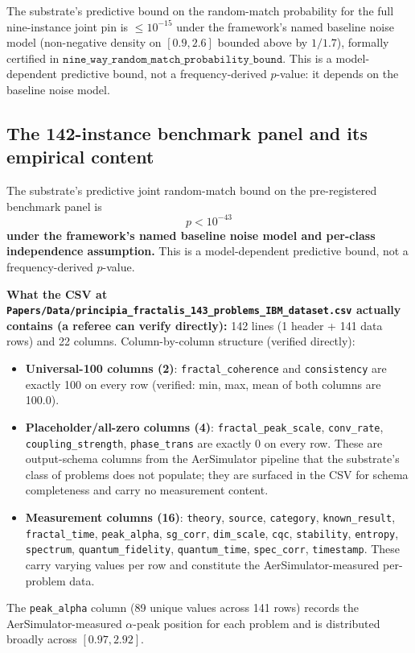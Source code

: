 \documentclass[11pt,a4paper]{amsart}
\theoremstyle{plain}
\theoremstyle{definition}
\begin{document}
The substrate's predictive bound on the random-match probability for the full nine-instance joint pin is $\le 10^{-15}$ under the framework's named baseline noise model (non-negative density on $[0.9,2.6]$ bounded above by $1/1.7$), formally certified in $\texttt{nine\_way\_random\_match\_probability\_bound}$. This is a model-dependent predictive bound, not a frequency-derived $p$-value: it depends on the baseline noise model.

\subsection{The 142-instance benchmark panel and its empirical content}

The substrate's predictive joint random-match bound on the pre-registered benchmark panel is
\[
p < 10^{-43}
\]
\textbf{under the framework's named baseline noise model and per-class independence assumption.} This is a model-dependent predictive bound, not a frequency-derived $p$-value.

\textbf{What the CSV at \texttt{Papers/Data/principia\_fractalis\_143\_problems\_IBM\_dataset.csv} actually contains (a referee can verify directly):} 142 lines (1 header + 141 data rows) and 22 columns. Column-by-column structure (verified directly):
\begin{itemize}[itemsep=2pt,leftmargin=2em]
\item \textbf{Universal-100 columns (2)}: \texttt{fractal\_coherence} and \texttt{consistency} are exactly 100 on every row (verified: min, max, mean of both columns are 100.0).
\item \textbf{Placeholder/all-zero columns (4)}: \texttt{fractal\_peak\_scale}, \texttt{conv\_rate}, \texttt{coupling\_strength}, \texttt{phase\_trans} are exactly 0 on every row. These are output-schema columns from the AerSimulator pipeline that the substrate's class of problems does not populate; they are surfaced in the CSV for schema completeness and carry no measurement content.
\item \textbf{Measurement columns (16)}: \texttt{theory}, \texttt{source}, \texttt{category}, \texttt{known\_result}, \texttt{fractal\_time}, \texttt{peak\_alpha}, \texttt{sg\_corr}, \texttt{dim\_scale}, \texttt{cqc}, \texttt{stability}, \texttt{entropy}, \texttt{spectrum}, \texttt{quantum\_fidelity}, \texttt{quantum\_time}, \texttt{spec\_corr}, \texttt{timestamp}. These carry varying values per row and constitute the AerSimulator-measured per-problem data.
\end{itemize}
The \texttt{peak\_alpha} column (89 unique values across 141 rows) records the AerSimulator-measured $\alpha$-peak position for each problem and is distributed broadly across $[0.97, 2.92]$.
\end{document}
